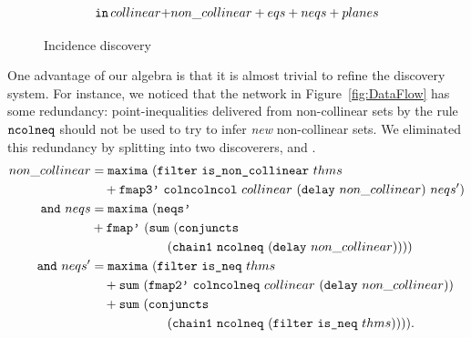 \begin{figure}
\begin{align*}
\quad \texttt{in}\,collinear + &non\_collinear + eqs + neqs + planes
\end{align*}
\caption{Incidence discovery}
\label{fig:IncidenceDiscoveryCode}
\end{figure}

One advantage of our algebra is that it is almost trivial to refine the discovery system. For instance, we noticed that the network in Figure~\ref{fig:DataFlow} has some redundancy: point-inequalities delivered from non-collinear sets by the rule $\texttt{ncolneq}$ should not be used to try to infer \emph{new} non-collinear sets. We eliminated this redundancy by splitting  into two discoverers,  and . 
\begin{align*}
non\_collinear &= \texttt{maxima}\ (\texttt{filter}\ \texttt{is\_non\_collinear}\ thms\\
&\quad + \texttt{fmap3'}\ \texttt{colncolncol}\ collinear\ (\texttt{delay}\ non\_collinear)\ neqs')\\
\texttt{and}\ neqs &= \texttt{maxima}\ (\texttt{neqs'}\\
& + \texttt{fmap'}\ (\texttt{sum}\ (\texttt{conjuncts}\\
&\qquad\qquad\qquad(\texttt{chain1}\ \texttt{ncolneq}\ (\texttt{delay}\ non\_collinear))))\\
\texttt{and}\ neqs' &= \texttt{maxima}\ (\texttt{filter}\ \texttt{is\_neq}\ thms\\
&\quad + \texttt{sum}\ (\texttt{fmap2'}\ \texttt{colncolneq}\ collinear\ (\texttt{delay}\ non\_collinear))\\
&\quad + \texttt{sum}\ (\texttt{conjuncts}\\
&\qquad\qquad\qquad(\texttt{chain1}\ \texttt{ncolneq}\ (\texttt{filter}\ \texttt{is\_neq}\ thms)))).
\end{align*}

